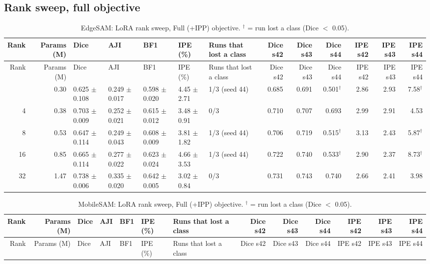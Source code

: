 \documentclass[10pt]{article}
\begin{document}
\begin{landscape}
\section{Rank sweep, full objective}
{\footnotesize
\begin{longtable}{r r l l l l l r r r r r r}
\caption{EdgeSAM: LoRA rank sweep, Full (+IPP) objective. $^\dagger$ = run lost a class (Dice $<$ 0.05).}\label{tab:rank_edge_sam}\\
\toprule
Rank & Params (M) & Dice & AJI & BF1 & IPE (\%) & Runs that lost a class & Dice s42 & Dice s43 & Dice s44 & IPE s42 & IPE s43 & IPE s44 \\
\midrule
\endfirsthead
\toprule
Rank & Params (M) & Dice & AJI & BF1 & IPE (\%) & Runs that lost a class & Dice s42 & Dice s43 & Dice s44 & IPE s42 & IPE s43 & IPE s44 \\
\midrule
\endhead
\bottomrule
\endfoot
2 & 0.30 & 0.625 $\pm$ 0.108 & 0.249 $\pm$ 0.017 & 0.598 $\pm$ 0.020 & 4.45 $\pm$ 2.71 & 1/3 (seed 44) & 0.685 & 0.691 & 0.501$^\dagger$ & 2.86 & 2.93 & 7.58$^\dagger$ \\
4 & 0.38 & 0.703 $\pm$ 0.009 & 0.252 $\pm$ 0.021 & 0.615 $\pm$ 0.012 & 3.48 $\pm$ 0.91 & 0/3 & 0.710 & 0.707 & 0.693 & 2.99 & 2.91 & 4.53 \\
8 & 0.53 & 0.647 $\pm$ 0.114 & 0.249 $\pm$ 0.043 & 0.608 $\pm$ 0.009 & 3.81 $\pm$ 1.82 & 1/3 (seed 44) & 0.706 & 0.719 & 0.515$^\dagger$ & 3.13 & 2.43 & 5.87$^\dagger$ \\
16 & 0.85 & 0.665 $\pm$ 0.114 & 0.277 $\pm$ 0.022 & 0.623 $\pm$ 0.024 & 4.66 $\pm$ 3.53 & 1/3 (seed 44) & 0.722 & 0.740 & 0.533$^\dagger$ & 2.90 & 2.37 & 8.73$^\dagger$ \\
32 & 1.47 & 0.738 $\pm$ 0.006 & 0.335 $\pm$ 0.020 & 0.642 $\pm$ 0.005 & 3.02 $\pm$ 0.84 & 0/3 & 0.731 & 0.743 & 0.740 & 2.66 & 2.41 & 3.98 \\
\end{longtable}
}
{\footnotesize
\begin{longtable}{r r l l l l l r r r r r r}
\caption{MobileSAM: LoRA rank sweep, Full (+IPP) objective. $^\dagger$ = run lost a class (Dice $<$ 0.05).}\label{tab:rank_mobile_sam}\\
\toprule
Rank & Params (M) & Dice & AJI & BF1 & IPE (\%) & Runs that lost a class & Dice s42 & Dice s43 & Dice s44 & IPE s42 & IPE s43 & IPE s44 \\
\midrule
\endfirsthead
\toprule
Rank & Params (M) & Dice & AJI & BF1 & IPE (\%) & Runs that lost a class & Dice s42 & Dice s43 & Dice s44 & IPE s42 & IPE s43 & IPE s44 \\

\end{longtable}}
\end{landscape}
\end{document}
